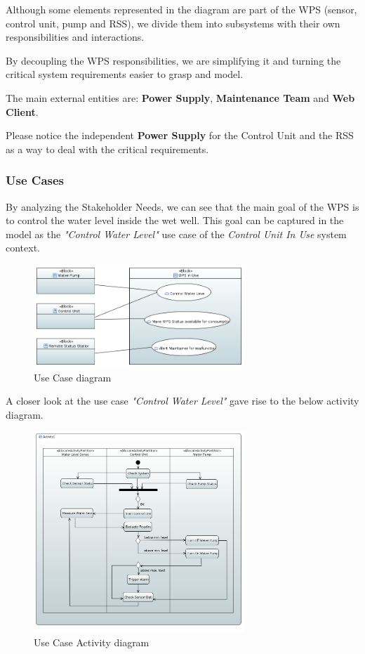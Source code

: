 \documentclass[11pt]{article}
\begin{document}
Although some elements represented in the diagram are part of the WPS (sensor, control unit, pump and RSS), we divide them into subsystems with their own responsibilities and interactions. 

By decoupling the WPS responsibilities, we are simplifying it and turning the critical system requirements easier to grasp and model.

The main external entities are: \textbf{Power Supply}, \textbf{Maintenance Team} and \textbf{Web Client}. 

Please notice the independent \textbf{Power Supply} for the Control Unit and the RSS as a way to deal with the critical requirements.

\subsubsection{Use Cases}

By analyzing the Stakeholder Needs, we can see that the main goal of the WPS is to control the water level inside the wet well. This goal can be captured in the model as the \textit{"Control Water Level"} use case of the \textit{Control Unit In Use} system context. 

\begin{figure}[H]
  \centering
  \includegraphics[width=300px]{../diagrams/use-cases-01.png}
  \caption{Use Case diagram}
  \label{fig:Use Case1}
\end{figure}

A closer look at the use case \textit{"Control Water Level"} gave rise to the below activity diagram.

\begin{figure}[H]
  \centering
  \includegraphics[width=300px]{../diagrams/use-case-activity-diagram-01.png}
  \caption{Use Case Activity diagram}
  \label{fig:Use Case2}
\end{figure}
\end{document}
